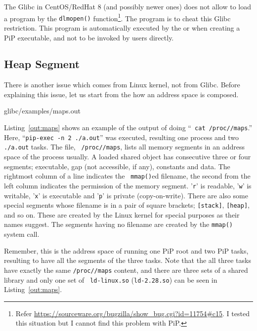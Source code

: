 The Glibc in CentOS/RedHat 8 (and possibly newer ones) does not allow
to load a program by the {\tt dlmopen()} function\footnote{Refer
\url{https://sourceware.org/bugzilla/show_bug.cgi?id=11754\#c15}. I
tested this situation but I cannot find this problem with PiP.}. The
 program is to cheat this Glibc restriction. This
program is automatically executed by the  or
 when creating a PiP executable, and not to be invoked
by users directly.


\subsection{Heap Segment}\label{sec:heap}


There is another issue which comes from Linux kernel, not from
Glibc. Before explaining this issue, let us start from the how an
address space is composed. 

 {glibc/examples/maps.out}

Listing~\ref{out:maps} shows an example of the output of doing ``{\tt
  cat /proc//maps}.'' Here, ``{\tt pip-exec -n 2
  ./a.out}'' was executed, resulting one  process
and two {\tt ./a.out} tasks. The file, {\tt
  /proc//maps}, lists all memory
segments in an address space of the process {\tt {}}
usually. A loaded shared object has consecutive three or four segments; 
executable, gap (not accessible, if any), constants and data. 
The rightmost column of a line indicates the {\tt
  mmap()}ed filename, the second from the left column indicates the
permission of the memory segment. '{\tt r}' is readable, '{\tt w}' is
writable, '{\tt x}' is executable and '{\tt p}' is private
(copy-on-write). There are also some special segments whose filename
is in a pair of square brackets; {\tt [stack]}, {\tt [heap]}, and so
on. These are created by the Linux kernel for special purposes as
their names suggest. The segments having no filename are created by
the {\tt mmap()} system call. 

Remember, this is the address space of running one PiP root and two PiP
tasks, resulting to have all the segments of the three tasks.
Note that the all three tasks have
exactly the same {\tt /proc//maps} content, and
there are three sets of a shared library and only one set of {\tt
  ld-linux.so} ({\tt ld-2.28.so}) can be seen in
Listing~\ref{out:maps}.

